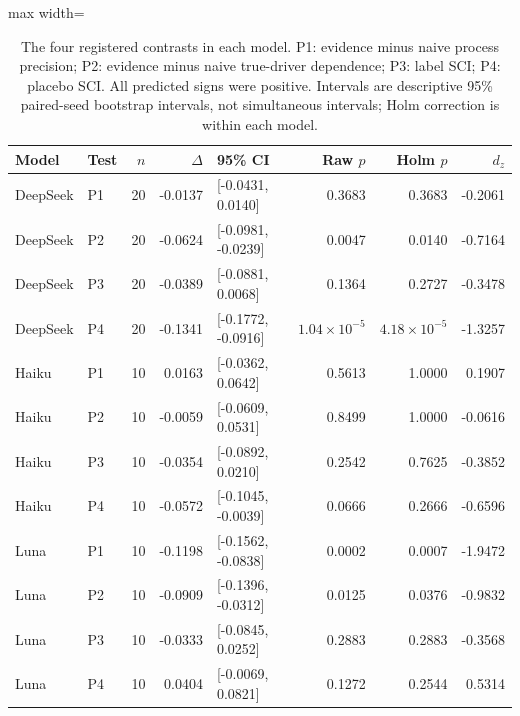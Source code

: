 \begin{table}[tbp]
\caption{The four registered contrasts in each model. P1: evidence minus naive process precision; P2: evidence minus naive true-driver dependence; P3: label SCI; P4: placebo SCI. All predicted signs were positive. Intervals are descriptive 95\% paired-seed bootstrap intervals, not simultaneous intervals; Holm correction is within each model.}
\label{tab:primary}
\centering\footnotesize
\setlength{\tabcolsep}{4pt}
\begin{adjustbox}{max width=\linewidth}
\begin{tabular}{llrrlrrr}
\toprule
Model & Test & $n$ & $\Delta$ & 95\% CI & Raw $p$ & Holm $p$ & $d_z$ \\
\midrule
DeepSeek & P1 & 20 & -0.0137 & [-0.0431, 0.0140] & 0.3683 & 0.3683 & -0.2061 \\
DeepSeek & P2 & 20 & -0.0624 & [-0.0981, -0.0239] & 0.0047 & 0.0140 & -0.7164 \\
DeepSeek & P3 & 20 & -0.0389 & [-0.0881, 0.0068] & 0.1364 & 0.2727 & -0.3478 \\
DeepSeek & P4 & 20 & -0.1341 & [-0.1772, -0.0916] & \(1.04\times10^{-5}\) & \(4.18\times10^{-5}\) & -1.3257 \\
Haiku & P1 & 10 & 0.0163 & [-0.0362, 0.0642] & 0.5613 & 1.0000 & 0.1907 \\
Haiku & P2 & 10 & -0.0059 & [-0.0609, 0.0531] & 0.8499 & 1.0000 & -0.0616 \\
Haiku & P3 & 10 & -0.0354 & [-0.0892, 0.0210] & 0.2542 & 0.7625 & -0.3852 \\
Haiku & P4 & 10 & -0.0572 & [-0.1045, -0.0039] & 0.0666 & 0.2666 & -0.6596 \\
Luna & P1 & 10 & -0.1198 & [-0.1562, -0.0838] & 0.0002 & 0.0007 & -1.9472 \\
Luna & P2 & 10 & -0.0909 & [-0.1396, -0.0312] & 0.0125 & 0.0376 & -0.9832 \\
Luna & P3 & 10 & -0.0333 & [-0.0845, 0.0252] & 0.2883 & 0.2883 & -0.3568 \\
Luna & P4 & 10 & 0.0404 & [-0.0069, 0.0821] & 0.1272 & 0.2544 & 0.5314 \\
\bottomrule
\end{tabular}
\end{adjustbox}
\end{table}
